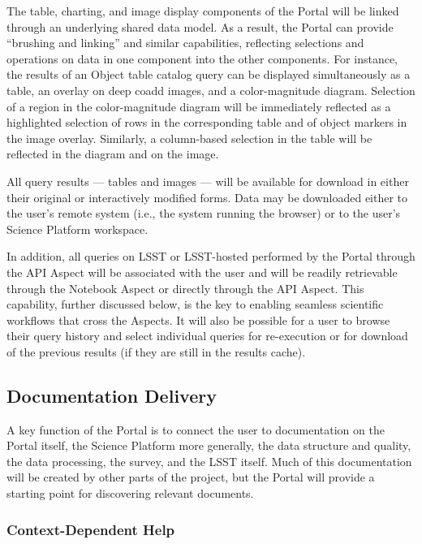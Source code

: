 The table, charting, and image display components of the Portal will be linked through an underlying shared data model.
As a result, the Portal can provide ``brushing and linking'' and similar capabilities, reflecting selections and operations on data in one component into the other components.
For instance, the results of an Object table catalog query can be displayed simultaneously as a table, an overlay on deep coadd images, and a color-magnitude diagram.
Selection of a region in the color-magnitude diagram will be immediately reflected as a highlighted selection of rows in the corresponding table and of object markers in the image overlay.
Similarly, a column-based selection in the table will be reflected in the diagram and on the image.

All query results --- tables and images --- will be available for download in either their original or interactively modified forms.
Data may be downloaded either to the user's remote system (i.e., the system running the browser) or to the user's Science Platform workspace.

In addition, all queries on LSST or LSST-hosted performed by the Portal through the API Aspect will be associated with the user and will be readily retrievable through the Notebook Aspect or directly through the API Aspect.
This capability, further discussed below, is the key to enabling seamless scientific workflows that cross the Aspects.
It will also be possible for a user to browse their query history and select individual queries for re-execution or for download of the previous results (if they are still in the results cache).

\subsection{Documentation Delivery}\label{documentation-delivery}

A key function of the Portal is to connect the user to documentation on the Portal itself, the Science Platform more generally, the data structure and quality, the data processing, the survey, and the LSST itself.
Much of this documentation will be created by other parts of the project, but the Portal will provide a starting point for discovering relevant documents.

\subsubsection{Context-Dependent Help}\label{context-dependent-help}


